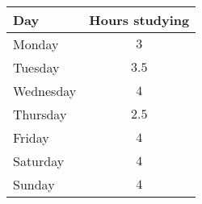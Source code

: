 \begin{tabular}{lc}         \toprule
Day       & Hours studying \\\midrule
Monday    & $3$            \\[6pt]
Tuesday   & $3.5$          \\[6pt]
Wednesday & $4$            \\[6pt]
Thursday  & $2.5$          \\[6pt]
Friday    & $4$            \\[6pt]
Saturday  & $4$            \\[6pt]
Sunday    & $4$            \\\bottomrule
\end{tabular}
